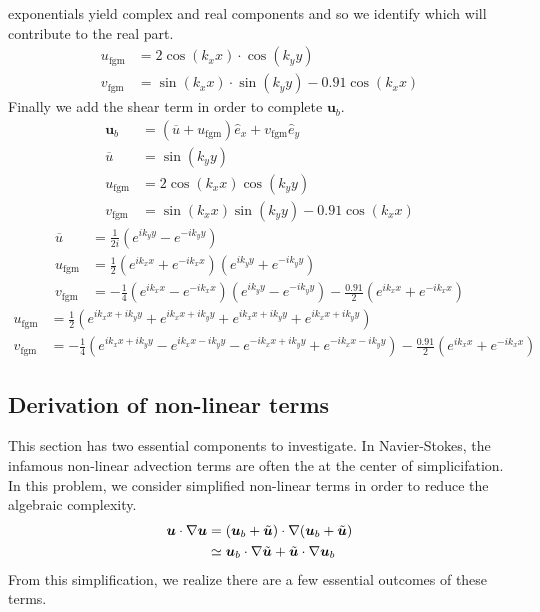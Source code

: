 \documentclass{article} \usepackage{amsfonts,amsmath, amssymb, xcolor, amsthm,}
\begin{document}
        exponentials yield complex and real components and so we identify which
        will contribute to the real part.  
        \begin{align*} 
            u_{\text{fgm}} &= 2\cos(k_xx)\cdot\cos(k_yy) \\
            v_{\text{fgm}} &= \sin(k_xx)\cdot\sin(k_yy) - 0.91\cos(k_xx) 
        \end{align*} 
        Finally we add the shear term in order to complete $\bm{u}_b$.  
        \begin{align*} 
            \bm{u}_b &= (\overline{u} + u_{\text{fgm}})\hat{e}_x + 
            v_{\text{fgm}}\hat{e}_y \\
            \overline{u} &= \sin(k_yy) \\ u_{\text{fgm}} &= 
            2\cos(k_xx)\cos(k_yy) \\
            v_{\text{fgm}} &= \sin(k_xx)\sin(k_yy) - 0.91\cos(k_xx) 
        \end{align*}
        \begin{align*}
            \overline{u} &= \frac{1}{2i}\left(e^{ik_yy} - e^{-ik_yy}\right) \\ 
            u_{\text{fgm}} &= \frac{1}{2}\left(e^{ik_xx} + e^{-ik_xx}\right) 
            \left(e^{ik_yy} + e^{-ik_yy}\right)\\
            v_{\text{fgm}} &= -\frac{1}{4}\left(e^{ik_xx} - e^{-ik_xx}\right)
            \left(e^{ik_yy} - e^{-ik_yy}\right) - \frac{0.91}{2}\left(e^{ik_xx} +
            e^{-ik_xx}\right)
        \end{align*}
        \begin{align}
            u_{\text{fgm}} &= \frac{1}{2}\left(e^{ik_xx + ik_yy} + e^{ik_xx + 
            ik_yy} + e^{ik_xx + ik_yy} + e^{ik_xx + ik_yy}\right)\\
            v_{\text{fgm}} &= -\frac{1}{4}\left(e^{ik_xx + ik_yy} - 
            e^{ik_xx - ik_yy} - e^{-ik_xx + ik_yy} + e^{-ik_xx - ik_yy}\right) - 
            \frac{0.91}{2}\left(e^{ik_xx} + e^{-ik_xx}\right)
        \end{align}
    \newpage 
    \subsection{Derivation of non-linear terms}

    This section has two essential components to investigate. In Navier-Stokes,
    the infamous non-linear advection terms are often the at the center of
    simplicifation. In this problem, we consider simplified non-linear terms in
    order to reduce the algebraic complexity. 
    \begin{align}
        \boldsymbol{u} \cdot \nabla \boldsymbol{u} &= (\boldsymbol{u}_{b} + \tilde{\boldsymbol{u}}) \cdot \nabla 
        (\boldsymbol{u}_{b} + \tilde{\boldsymbol{u}})\\
        &\simeq \boldsymbol{u}_b \cdot \nabla \tilde{\boldsymbol{u}} + \tilde{\boldsymbol{u}} \cdot \nabla 
        \boldsymbol{u}_b
    \end{align}
    From this simplification, we realize there are a few essential outcomes of
    these terms. 
\end{document}
